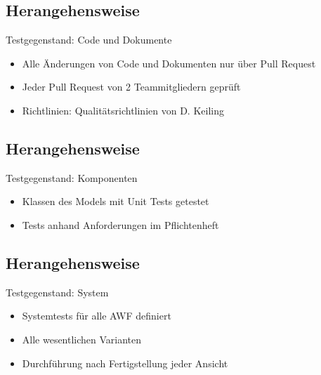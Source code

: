 \documentclass{beamer}
\begin{document}
  \subsection{Herangehensweise}
  \begin{frame}{\subsecname}
    \begin{block}{Testgegenstand: Code und Dokumente}
      \begin{itemize}
        \item Alle Änderungen von Code und Dokumenten nur über Pull Request
        \item Jeder Pull Request von 2 Teammitgliedern geprüft
        \item Richtlinien: Qualitätsrichtlinien von D. Keiling
      \end{itemize}
    \end{block}
  \end{frame}

  \subsection{Herangehensweise}
  \begin{frame}{\subsecname}
    \begin{block}{Testgegenstand: Komponenten}
      \begin{itemize}
        \item Klassen des Models mit Unit Tests getestet
        \item Tests anhand Anforderungen im Pflichtenheft
      \end{itemize}
    \end{block}
  \end{frame}

  \subsection{Herangehensweise}
  \begin{frame}{\subsecname}
    \begin{block}{Testgegenstand: System}
      \begin{itemize}
        \item Systemtests für alle AWF definiert
        \item Alle wesentlichen Varianten
        \item Durchführung nach Fertigstellung jeder Ansicht
      \end{itemize}
    \end{block}
  \end{frame}
\end{document}
